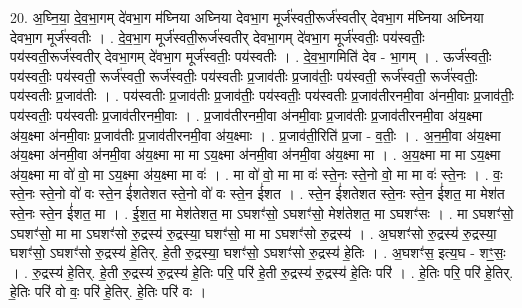 \documentclass[17pt]{extarticle}
\begin{document}
20. अ॒घ्नि॒या॒ दे॒व॒भा॒गम् दे॑वभा॒ग म॑घ्निया अघ्निया देवभा॒ग मूर्ज॑स्वती॒रूर्ज॑स्वतीर् देवभा॒ग म॑घ्निया अघ्निया देवभा॒ग मूर्ज॑स्वतीः । . दे॒व॒भा॒ग मूर्ज॑स्वती॒रूर्ज॑स्वतीर् देवभा॒गम् दे॑वभा॒ग मूर्ज॑स्वतीः॒ पय॑स्वतीः॒ पय॑स्वती॒रूर्ज॑स्वतीर् देवभा॒गम् दे॑वभा॒ग मूर्ज॑स्वतीः॒ पय॑स्वतीः । . दे॒व॒भा॒गमिति॑ देव - भा॒गम् । . ऊर्ज॑स्वतीः॒ पय॑स्वतीः॒ पय॑स्वती॒ रूर्ज॑स्वती॒ रूर्ज॑स्वतीः॒ पय॑स्वतीः प्र॒जाव॑तीः प्र॒जाव॑तीः॒ पय॑स्वती॒ रूर्ज॑स्वती॒ रूर्ज॑स्वतीः॒ पय॑स्वतीः प्र॒जाव॑तीः । . पय॑स्वतीः प्र॒जाव॑तीः प्र॒जाव॑तीः॒ पय॑स्वतीः॒ पय॑स्वतीः प्र॒जाव॑तीरनमी॒वा अ॑नमी॒वाः प्र॒जाव॑तीः॒ पय॑स्वतीः॒ पय॑स्वतीः प्र॒जाव॑तीरनमी॒वाः । . प्र॒जाव॑तीरनमी॒वा अ॑नमी॒वाः प्र॒जाव॑तीः प्र॒जाव॑तीरनमी॒वा अ॑य॒क्ष्मा अ॑य॒क्ष्मा अ॑नमी॒वाः प्र॒जाव॑तीः प्र॒जाव॑तीरनमी॒वा अ॑य॒क्ष्माः । . प्र॒जाव॑ती॒रिति॑ प्र॒जा - व॒तीः॒ । . अ॒न॒मी॒वा अ॑य॒क्ष्मा अ॑य॒क्ष्मा अ॑नमी॒वा अ॑नमी॒वा अ॑य॒क्ष्मा मा मा ऽय॒क्ष्मा अ॑नमी॒वा अ॑नमी॒वा अ॑य॒क्ष्मा मा । . अ॒य॒क्ष्मा मा मा ऽय॒क्ष्मा अ॑य॒क्ष्मा मा वो॑ वो॒ मा ऽय॒क्ष्मा अ॑य॒क्ष्मा मा वः॑ । . मा वो॑ वो॒ मा मा वः॑ स्ते॒नः स्ते॒नो वो॒ मा मा वः॑ स्ते॒नः । . वः॒ स्ते॒नः स्ते॒नो वो॑ वः स्ते॒न ई॑शतेशत स्ते॒नो वो॑ वः स्ते॒न ई॑शत । . स्ते॒न ई॑शतेशत स्ते॒नः स्ते॒न ई॑शत॒ मा मेश॑त स्ते॒नः स्ते॒न ई॑शत॒ मा । . ई॒श॒त॒ मा मेश॑तेशत॒ मा ऽघशꣳ॑सो॒ ऽघशꣳ॑सो॒ मेश॑तेशत॒ मा ऽघशꣳ॑सः । . मा ऽघशꣳ॑सो॒ ऽघशꣳ॑सो॒ मा मा ऽघशꣳ॑सो रु॒द्रस्य॑ रु॒द्रस्या॒ घशꣳ॑सो॒ मा मा ऽघशꣳ॑सो रु॒द्रस्य॑ । . अ॒घशꣳ॑सो रु॒द्रस्य॑ रु॒द्रस्या॒ घशꣳ॑सो॒ ऽघशꣳ॑सो रु॒द्रस्य॑ हे॒तिर्. हे॒ती रु॒द्रस्या॒ घशꣳ॑सो॒ ऽघशꣳ॑सो रु॒द्रस्य॑ हे॒तिः । . अ॒घशꣳ॑स॒ इत्य॒घ - शꣳ॒॒सः॒ । . रु॒द्रस्य॑ हे॒तिर्. हे॒ती रु॒द्रस्य॑ रु॒द्रस्य॑ हे॒तिः परि॒ परि॑ हे॒ती रु॒द्रस्य॑ रु॒द्रस्य॑ हे॒तिः परि॑ । . हे॒तिः परि॒ परि॑ हे॒तिर्. हे॒तिः परि॑ वो वः॒ परि॑ हे॒तिर्. हे॒तिः परि॑ वः । \newline
\end{document}
